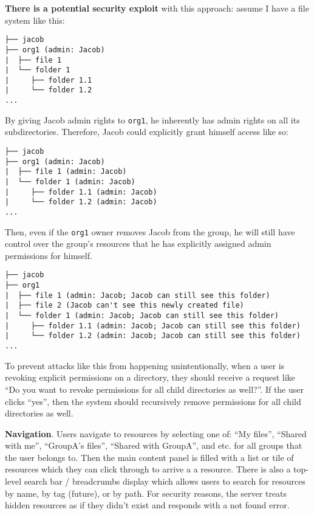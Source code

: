 \textbf{There is a potential security exploit} with this approach:
assume I have a file system like this:

\begin{verbatim}
├── jacob
├── org1 (admin: Jacob)
|  ├── file 1
|  └── folder 1
|     ├── folder 1.1
|     └── folder 1.2
...
\end{verbatim}

By giving Jacob admin rights to \texttt{org1}, he inherently has admin
rights on all its subdirectories. Therefore, Jacob could explicitly
grant himself access like so:

\begin{verbatim}
├── jacob
├── org1 (admin: Jacob)
|  ├── file 1 (admin: Jacob)
|  └── folder 1 (admin: Jacob)
|     ├── folder 1.1 (admin: Jacob)
|     └── folder 1.2 (admin: Jacob)
...
\end{verbatim}

Then, even if the \texttt{org1} owner removes Jacob from the group, he
will still have control over the group's resources that he has
explicitly assigned admin permissions for himself.

\begin{verbatim}
├── jacob
├── org1
|  ├── file 1 (admin: Jacob; Jacob can still see this folder)
|  ├── file 2 (Jacob can't see this newly created file)
|  └── folder 1 (admin: Jacob; Jacob can still see this folder)
|     ├── folder 1.1 (admin: Jacob; Jacob can still see this folder)
|     └── folder 1.2 (admin: Jacob; Jacob can still see this folder)
...
\end{verbatim}

To prevent attacks like this from happening unintentionally, when a user
is revoking explicit permissions on a directory, they should receive a
request like ``Do you want to revoke permissions for all child
directories as well?''. If the user clicks ``yes'', then the system
should recursively remove permissions for all child directories as well.

\textbf{Navigation}. Users navigate to resources by selecting one of:
``My files'', ``Shared with me'', ``GroupA's files'', ``Shared with
GroupA'', and etc. for all groups that the user belongs to. Then the
main content panel is filled with a list or tile of resources which they
can click through to arrive a a resource. There is also a top-level
search bar / breadcrumbs display which allows users to search for
resources by name, by tag (future), or by path. For security reasons,
the server treats hidden resources as if they didn't exist and responds
with a not found error.

